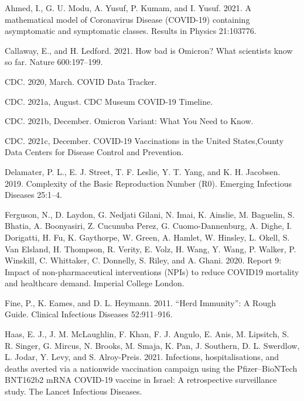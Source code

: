 \documentclass[
  12pt,
]{article}
\newlength{\cslhangindent}
\newlength{\cslentryspacingunit} %
\newenvironment{CSLReferences}[2] %
 {%
  \setlength{\parindent}{0pt}
  \ifodd #1
  \let\oldpar\par
  \def\par{\hangindent=\cslhangindent\oldpar}
  \fi
  \setlength{\parskip}{#2\cslentryspacingunit}
 }%
 {}
\begin{document}
\hypertarget{refs}{}
\begin{CSLReferences}{1}{0}
\leavevmode{}%
Ahmed, I., G. U. Modu, A. Yusuf, P. Kumam, and I. Yusuf. 2021. A mathematical model of {Coronavirus} {Disease} ({COVID}-19) containing asymptomatic and symptomatic classes. Results in Physics 21:103776.

\leavevmode{}%
Callaway, E., and H. Ledford. 2021. How bad is {Omicron}? {What} scientists know so far. Nature 600:197--199.

\leavevmode{}%
CDC. 2020, March. {COVID} {Data} {Tracker}.

\leavevmode{}%
CDC. 2021a, August. {CDC} {Museum} {COVID}-19 {Timeline}.

\leavevmode{}%
CDC. 2021b, December. Omicron {Variant}: {What} {You} {Need} to {Know}.

\leavevmode{}%
CDC. 2021c, December. {COVID}-19 {Vaccinations} in the {United} {States},{County} {\textbar} {Data} {\textbar} {Centers} for {Disease} {Control} and {Prevention}.

\leavevmode{}%
Delamater, P. L., E. J. Street, T. F. Leslie, Y. T. Yang, and K. H. Jacobsen. 2019. Complexity of the {Basic} {Reproduction} {Number} ({R0}). Emerging Infectious Diseases 25:1--4.

\leavevmode{}%
Ferguson, N., D. Laydon, G. Nedjati Gilani, N. Imai, K. Ainslie, M. Baguelin, S. Bhatia, A. Boonyasiri, Z. Cucunuba Perez, G. Cuomo-Dannenburg, A. Dighe, I. Dorigatti, H. Fu, K. Gaythorpe, W. Green, A. Hamlet, W. Hinsley, L. Okell, S. Van Elsland, H. Thompson, R. Verity, E. Volz, H. Wang, Y. Wang, P. Walker, P. Winskill, C. Whittaker, C. Donnelly, S. Riley, and A. Ghani. 2020. Report 9: {Impact} of non-pharmaceutical interventions ({NPIs}) to reduce {COVID19} mortality and healthcare demand. Imperial College London.

\leavevmode{}%
Fine, P., K. Eames, and D. L. Heymann. 2011. {``{Herd} {Immunity}''}: {A} {Rough} {Guide}. Clinical Infectious Diseases 52:911--916.

\leavevmode{}%
Haas, E. J., J. M. McLaughlin, F. Khan, F. J. Angulo, E. Anis, M. Lipsitch, S. R. Singer, G. Mircus, N. Brooks, M. Smaja, K. Pan, J. Southern, D. L. Swerdlow, L. Jodar, Y. Levy, and S. Alroy-Preis. 2021. Infections, hospitalisations, and deaths averted via a nationwide vaccination campaign using the {Pfizer}--{BioNTech} {BNT162b2} {mRNA} {COVID}-19 vaccine in {Israel}: A retrospective surveillance study. The Lancet Infectious Diseases.


\end{CSLReferences}
\end{document}
